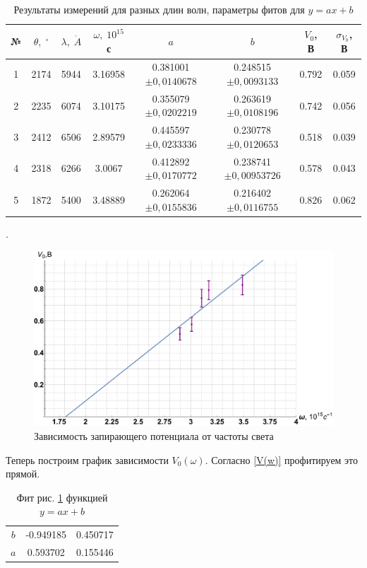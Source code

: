\documentclass[12pt]{kiarticle} %
\begin{document}
\begin{table}[h!]
	\caption{Результаты измерений для разных длин волн, параметры фитов для $ y = ax + b $}
	\begin{center}
		\begin{tabular}{|c|c|c|c|c|c|c|c|}
			\hline
			№ & $ \theta, \; ^\circ $& $ \lambda, \; \mathring{A} $ &  $ \omega, \; 10^{15} $ с & $ a $ & $ b $ & $ V_0 $, В & $ \sigma_{V_0} $, В \\
			\hline
		 1 & 2174 & 5944 & 3.16958 & 0.381001 $ \pm 0,0140678 $ & 0.248515 $ \pm 0,0093133 $& 0.792 & 0.059 \\
		2 & 2235 & 6074 & 3.10175 & 0.355079 $ \pm 0,0202219 $ & 0.263619 $ \pm 0,0108196 $& 0.742 & 0.056 \\
		3 & 2412 & 6506 & 2.89579 & 0.445597 $ \pm 0,0233336 $& 0.230778 $ \pm 0,0120653 $& 0.518 & 0.039 \\
		4 & 2318 & 6266 & 3.0067 & 0.412892 $ \pm 0,0170772 $ & 0.238741 $ \pm 0,00953726 $& 0.578 & 0.043 \\
		5 & 1872 & 5400 & 3.48889 & 0.262064 $ \pm0,0155836 $ & 0.216402 $ \pm 0,0116755 $& 0.826 & 0.062 \\
			\hline
		\end{tabular} 
	\end{center}
	\label{}
\end{table}
	\newpage
	.
	\begin{figure}[H]
		\includegraphics[scale=0.5]{V0.pdf}
		\caption{Зависимость запирающего потенциала
			от частоты света}
		\label{graf V0}
	\end{figure} 

Теперь построим график зависимости $ V_0(\omega) $. Согласно \eqref{V(w)} профитируем это прямой.

\begin{table}[H]
	\caption{Фит рис. \ref{graf V0} функцией $ y = ax + b $}
	\begin{center}
		\begin{tabular}{|c|c|c|}
			\hline
			& \text{Estimate} & \text{Standard Error} \\
			\hline
		 $ b $ & -0.949185 & 0.450717 \\
		$ a $ & 0.593702 & 0.155446 \\
			\hline 
		\end{tabular} 
	\end{center}
	\label{}
\end{table}
	
\end{document}
